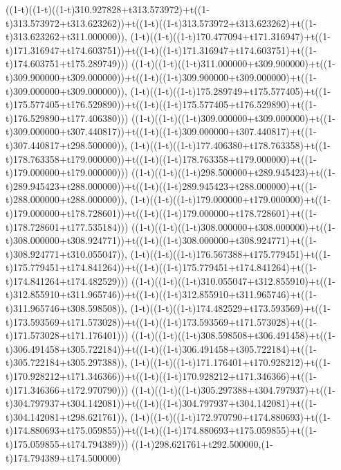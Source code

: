 ((1-t)((1-t)((1-t)310.927828+t313.573972)+t((1-t)313.573972+t313.623262))+t((1-t)((1-t)313.573972+t313.623262)+t((1-t)313.623262+t311.000000)),                                     (1-t)((1-t)((1-t)170.477094+t171.316947)+t((1-t)171.316947+t174.603751))+t((1-t)((1-t)171.316947+t174.603751)+t((1-t)174.603751+t175.289749)))
((1-t)((1-t)((1-t)311.000000+t309.900000)+t((1-t)309.900000+t309.000000))+t((1-t)((1-t)309.900000+t309.000000)+t((1-t)309.000000+t309.000000)),                                     (1-t)((1-t)((1-t)175.289749+t175.577405)+t((1-t)175.577405+t176.529890))+t((1-t)((1-t)175.577405+t176.529890)+t((1-t)176.529890+t177.406380)))
((1-t)((1-t)((1-t)309.000000+t309.000000)+t((1-t)309.000000+t307.440817))+t((1-t)((1-t)309.000000+t307.440817)+t((1-t)307.440817+t298.500000)),                                     (1-t)((1-t)((1-t)177.406380+t178.763358)+t((1-t)178.763358+t179.000000))+t((1-t)((1-t)178.763358+t179.000000)+t((1-t)179.000000+t179.000000)))
((1-t)((1-t)((1-t)298.500000+t289.945423)+t((1-t)289.945423+t288.000000))+t((1-t)((1-t)289.945423+t288.000000)+t((1-t)288.000000+t288.000000)),                                     (1-t)((1-t)((1-t)179.000000+t179.000000)+t((1-t)179.000000+t178.728601))+t((1-t)((1-t)179.000000+t178.728601)+t((1-t)178.728601+t177.535184)))
((1-t)((1-t)((1-t)308.000000+t308.000000)+t((1-t)308.000000+t308.924771))+t((1-t)((1-t)308.000000+t308.924771)+t((1-t)308.924771+t310.055047)),                                     (1-t)((1-t)((1-t)176.567388+t175.779451)+t((1-t)175.779451+t174.841264))+t((1-t)((1-t)175.779451+t174.841264)+t((1-t)174.841264+t174.482529)))
((1-t)((1-t)((1-t)310.055047+t312.855910)+t((1-t)312.855910+t311.965746))+t((1-t)((1-t)312.855910+t311.965746)+t((1-t)311.965746+t308.598508)),                                     (1-t)((1-t)((1-t)174.482529+t173.593569)+t((1-t)173.593569+t171.573028))+t((1-t)((1-t)173.593569+t171.573028)+t((1-t)171.573028+t171.176401)))
((1-t)((1-t)((1-t)308.598508+t306.491458)+t((1-t)306.491458+t305.722184))+t((1-t)((1-t)306.491458+t305.722184)+t((1-t)305.722184+t305.297388)),                                     (1-t)((1-t)((1-t)171.176401+t170.928212)+t((1-t)170.928212+t171.346366))+t((1-t)((1-t)170.928212+t171.346366)+t((1-t)171.346366+t172.970790)))
((1-t)((1-t)((1-t)305.297388+t304.797937)+t((1-t)304.797937+t304.142081))+t((1-t)((1-t)304.797937+t304.142081)+t((1-t)304.142081+t298.621761)),                                     (1-t)((1-t)((1-t)172.970790+t174.880693)+t((1-t)174.880693+t175.059855))+t((1-t)((1-t)174.880693+t175.059855)+t((1-t)175.059855+t174.794389)))
((1-t)298.621761+t292.500000,(1-t)174.794389+t174.500000)
